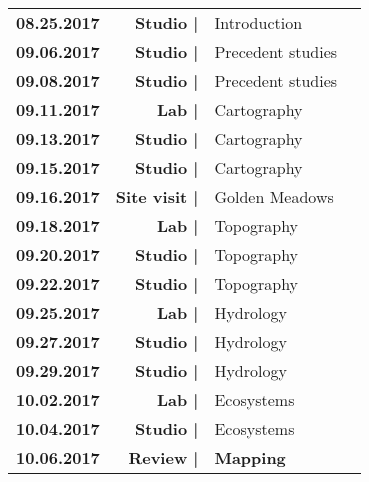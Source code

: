 \documentclass[11pt,article,oneside]{memoir}
\begin{document}
\begin{table}[H]
\small
\begin{tabular}{l r @{\hskip 0.1cm} l @{\hskip 0.5cm} l}
%
\textbf{08.25.2017} & \textbf{Studio |} & Introduction\\
%
\textbf{09.06.2017} & \textbf{Studio |} & Precedent studies\\
\textbf{09.08.2017} & \textbf{Studio |} & Precedent studies\\
%
\textbf{09.11.2017} & \textbf{Lab |} & Cartography\\
\textbf{09.13.2017} & \textbf{Studio |} & Cartography\\
\textbf{09.15.2017} & \textbf{Studio |} & Cartography\\
%
\textbf{09.16.2017} & \textbf{Site visit |} & Golden Meadows\\
%
\textbf{09.18.2017} & \textbf{Lab |} & Topography\\
\textbf{09.20.2017} & \textbf{Studio |} & Topography\\
\textbf{09.22.2017} & \textbf{Studio |} & Topography\\
%
\textbf{09.25.2017} & \textbf{Lab |} & Hydrology\\
\textbf{09.27.2017} & \textbf{Studio |} & Hydrology\\
\textbf{09.29.2017} & \textbf{Studio |} & Hydrology\\
%
\textbf{10.02.2017} & \textbf{Lab |} & Ecosystems\\
\textbf{10.04.2017} & \textbf{Studio |} & Ecosystems\\
\textbf{10.06.2017} & \textbf{Review |} & \textbf{Mapping}\\
%
\end{tabular}
\end{table}
\end{document}
